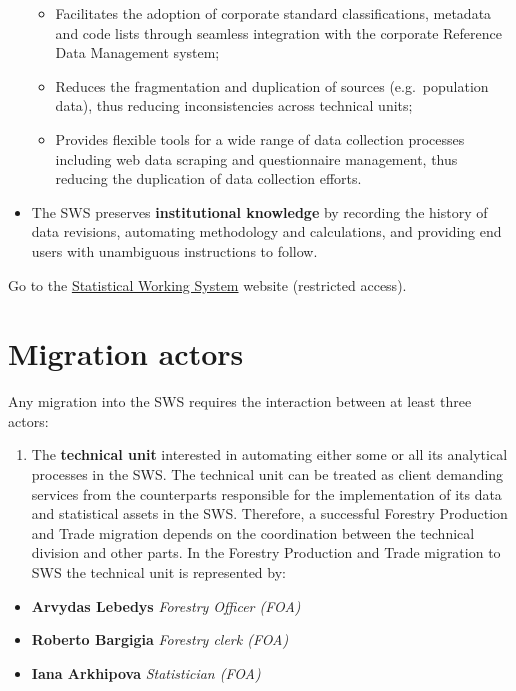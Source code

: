 \documentclass[
]{book}
\providecommand{\tightlist}{%
  \setlength{\itemsep}{0pt}\setlength{\parskip}{0pt}}
\begin{document}
\begin{itemize}
  \begin{itemize}
  \tightlist
  \item
    Facilitates the adoption of corporate standard classifications, metadata and code lists through seamless integration with the corporate Reference Data Management system;
  \item
    Reduces the fragmentation and duplication of sources (e.g.~population data), thus reducing inconsistencies across technical units;
  \item
    Provides flexible tools for a wide range of data collection processes including web data scraping and questionnaire management, thus reducing the duplication of data collection efforts.
  \end{itemize}
\item
  The SWS preserves \textbf{institutional knowledge} by recording the history of data revisions, automating methodology and calculations, and providing end users with unambiguous instructions to follow.
\end{itemize}

Go to the \href{https://hqlqasws1.hq.un.fao.org:8443/sws/}{Statistical Working System} website (restricted access).

\hypertarget{migration-actors}{%
\section*{\texorpdfstring{\textbf{Migration actors}}{Migration actors}}\label{migration-actors}}

Any migration into the SWS requires the interaction between at least three actors:

\begin{enumerate}
\def\labelenumi{\arabic{enumi}.}
\tightlist
\item
  The \textbf{technical unit} interested in automating either some or all its analytical processes in the SWS. The technical unit can be treated as client demanding services from the counterparts responsible for the implementation of its data and statistical assets in the SWS. Therefore, a successful Forestry Production and Trade migration depends on the coordination between the technical division and other parts. In the Forestry Production and Trade migration to SWS the technical unit is represented by:
\end{enumerate}

\begin{itemize}
\tightlist
\item
  \textbf{Arvydas Lebedys} \emph{Forestry Officer (FOA)}
\item
  \textbf{Roberto Bargigia} \emph{Forestry clerk (FOA)}
\item
  \textbf{Iana Arkhipova} \emph{Statistician (FOA)}
\end{itemize}
\end{document}
